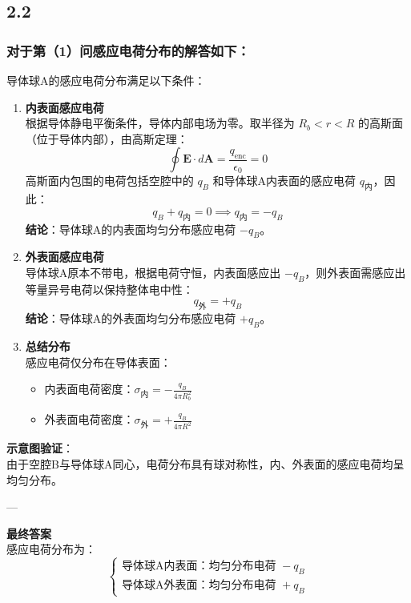 \documentclass{article}
\begin{document}
{\subsection*{2.2}

\subsubsection*{对于第（1）问感应电荷分布的解答如下：}

导体球A的感应电荷分布满足以下条件：
\begin{enumerate}
    \item \textbf{内表面感应电荷}  \\
    根据导体静电平衡条件，导体内部电场为零。取半径为 \( R_b < r < R \) 的高斯面（位于导体内部），由高斯定理：
    \[
    \oint \mathbf{E} \cdot d\mathbf{A} = \frac{q_{\text{enc}}}{\epsilon_0} = 0
    \]
    高斯面内包围的电荷包括空腔中的 \( q_B \) 和导体球A内表面的感应电荷 \( q_{\text{内}} \)，因此：
    \[
    q_B + q_{\text{内}} = 0 \implies q_{\text{内}} = -q_B
    \]
    \textbf{结论}：导体球A的内表面均匀分布感应电荷 \( -q_B \)。

    \item \textbf{外表面感应电荷}  \\
    导体球A原本不带电，根据电荷守恒，内表面感应出 \( -q_B \)，则外表面需感应出等量异号电荷以保持整体电中性：
    \[
    q_{\text{外}} = +q_B
    \]
    \textbf{结论}：导体球A的外表面均匀分布感应电荷 \( +q_B \)。

    \item \textbf{总结分布}  \\
    感应电荷仅分布在导体表面：  
    \begin{itemize}
        \item 内表面电荷密度：\( \sigma_{\text{内}} = -\frac{q_B}{4\pi R_b^2} \)  
        \item 外表面电荷密度：\( \sigma_{\text{外}} = +\frac{q_B}{4\pi R^2} \)
    \end{itemize}
\end{enumerate}

\textbf{示意图验证}：  \\
由于空腔B与导体球A同心，电荷分布具有球对称性，内、外表面的感应电荷均呈均匀分布。

---

\textbf{最终答案}  \\
感应电荷分布为：  
\[
\boxed{
\begin{cases}
\text{导体球A内表面：均匀分布电荷 } -q_B \\
\text{导体球A外表面：均匀分布电荷 } +q_B
\end{cases}
}
\]

}
\end{document}
